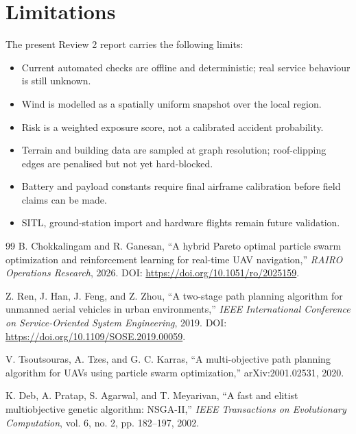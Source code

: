 \documentclass{ssnreview}
\begin{document}
\section{Limitations}
The present Review 2 report carries the following limits:
\begin{itemize}
  \item Current automated checks are offline and deterministic; real service behaviour is still unknown.
  \item Wind is modelled as a spatially uniform snapshot over the local region.
  \item Risk is a weighted exposure score, not a calibrated accident probability.
  \item Terrain and building data are sampled at graph resolution; roof-clipping edges are penalised but not yet
  hard-blocked.
  \item Battery and payload constants require final airframe calibration before field claims can be made.
  \item SITL, ground-station import and hardware flights remain future validation.
\end{itemize}

\begin{thebibliography}{99}
B. Chokkalingam and R. Ganesan, ``A hybrid Pareto optimal particle swarm optimization and reinforcement learning for
real-time UAV navigation,'' \textit{RAIRO Operations Research}, 2026. DOI: \url{https://doi.org/10.1051/ro/2025159}.

Z. Ren, J. Han, J. Feng, and Z. Zhou, ``A two-stage path planning algorithm for unmanned aerial vehicles in
urban environments,'' \textit{IEEE International Conference on Service-Oriented System Engineering}, 2019.
DOI: \url{https://doi.org/10.1109/SOSE.2019.00059}.

V. Tsoutsouras, A. Tzes, and G. C. Karras, ``A multi-objective path planning algorithm for UAVs using particle swarm
optimization,'' arXiv:2001.02531, 2020.

K. Deb, A. Pratap, S. Agarwal, and T. Meyarivan, ``A fast and elitist multiobjective genetic algorithm: NSGA-II,''
\textit{IEEE Transactions on Evolutionary Computation}, vol. 6, no. 2, pp. 182--197, 2002.
\end{thebibliography}
\end{document}

